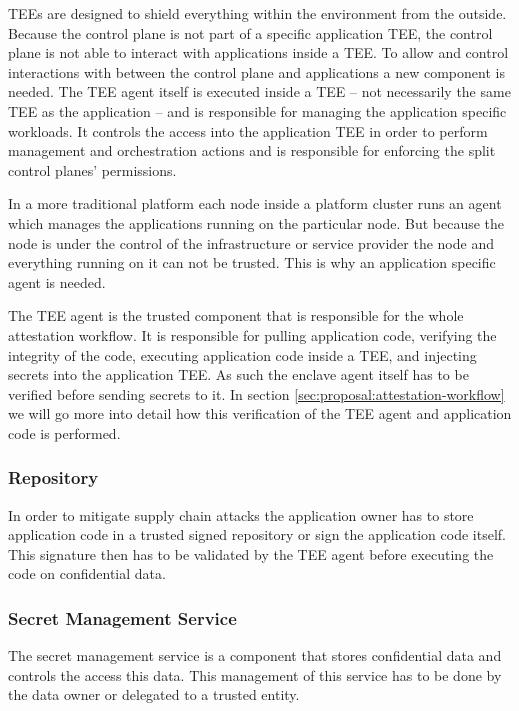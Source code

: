 TEEs are designed to shield everything within the environment from the outside.
Because the control plane is not part of a specific application TEE, the control
plane is not able to interact with applications inside a TEE. To allow and
control interactions with between the control plane and applications a new
component is needed. The TEE agent itself is executed inside a TEE -- not
necessarily the same TEE as the application -- and is responsible for managing
the application specific workloads. It controls the access into the application
TEE in order to perform management and orchestration actions and is responsible
for enforcing the split control planes' permissions.

In a more traditional platform each node inside a platform cluster runs an agent
which manages the applications running on the particular node. But because the
node is under the control of the infrastructure or service provider the node and
everything running on it can not be trusted. This is why an application specific
agent is needed.

The TEE agent is the trusted component that is responsible for the whole
attestation workflow. It is responsible for pulling application code, verifying
the integrity of the code, executing application code inside a TEE, and
injecting secrets into the application TEE. As such the enclave agent itself has
to be verified before sending secrets to it. In section
\ref{sec:proposal:attestation-workflow} we will go more into detail how this
verification of the TEE agent and application code is performed.

\subsubsection{Repository}

In order to mitigate supply chain attacks the application owner has to store
application code in a trusted signed repository or sign the application code
itself. This signature then has to be validated by the TEE agent before
executing the code on confidential data.

\subsubsection{Secret Management Service}

The secret management service is a component that stores confidential data and
controls the access this data. This management of this service has to be done by
the data owner or delegated to a trusted entity.

